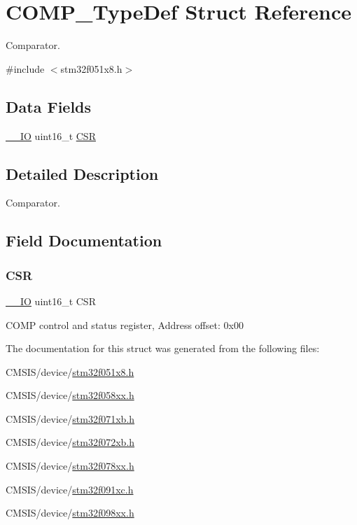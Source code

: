 \hypertarget{struct_c_o_m_p___type_def}{}\section{C\+O\+M\+P\+\_\+\+Type\+Def Struct Reference}
\label{struct_c_o_m_p___type_def}


Comparator.  




{\ttfamily \#include $<$stm32f051x8.\+h$>$}

\subsection*{Data Fields}
\begin{DoxyCompactItemize}
\item 
\hyperlink{core__sc300_8h_aec43007d9998a0a0e01faede4133d6be}{\+\_\+\+\_\+\+IO} uint16\+\_\+t \hyperlink{struct_c_o_m_p___type_def_ab5d0eeb11a728846c639375a18225d1f}{C\+SR}
\end{DoxyCompactItemize}


\subsection{Detailed Description}
Comparator. 

\subsection{Field Documentation}
\mbox{\label{struct_c_o_m_p___type_def_ab5d0eeb11a728846c639375a18225d1f}} 
\subsubsection{\texorpdfstring{C\+SR}{CSR}}
{\footnotesize\ttfamily \hyperlink{core__sc300_8h_aec43007d9998a0a0e01faede4133d6be}{\+\_\+\+\_\+\+IO} uint16\+\_\+t C\+SR}

C\+O\+MP control and status register, Address offset\+: 0x00 

The documentation for this struct was generated from the following files\+:\begin{DoxyCompactItemize}
\item 
C\+M\+S\+I\+S/device/\hyperlink{stm32f051x8_8h}{stm32f051x8.\+h}\item 
C\+M\+S\+I\+S/device/\hyperlink{stm32f058xx_8h}{stm32f058xx.\+h}\item 
C\+M\+S\+I\+S/device/\hyperlink{stm32f071xb_8h}{stm32f071xb.\+h}\item 
C\+M\+S\+I\+S/device/\hyperlink{stm32f072xb_8h}{stm32f072xb.\+h}\item 
C\+M\+S\+I\+S/device/\hyperlink{stm32f078xx_8h}{stm32f078xx.\+h}\item 
C\+M\+S\+I\+S/device/\hyperlink{stm32f091xc_8h}{stm32f091xc.\+h}\item 
C\+M\+S\+I\+S/device/\hyperlink{stm32f098xx_8h}{stm32f098xx.\+h}\end{DoxyCompactItemize}
